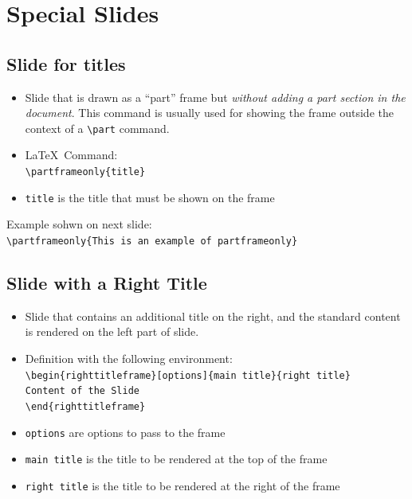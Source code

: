 \documentclass[english,sectioncirclenumberstyle]{ciadbeamer}
\begin{document}
\section{Special Slides}
\sectiontableofcontentslide

\subsection{Slide for titles}

\begin{frame}{\subsecname}
	\begin{itemize}
	\item Slide that is drawn as a ``part'' frame but \emph{without adding a part section in the document}. This command is usually used for showing the frame outside the context of a \texttt{{\textbackslash}part} command.
	\item \LaTeX\ Command:\\
		\texttt{{\textbackslash}partframeonly\{title\}}
	\item \texttt{title} is the title that must be shown on the frame
	\end{itemize}
	\vspace{1cm}
	Example sohwn on next slide: \\
	\texttt{{\textbackslash}partframeonly\{This is an example of partframeonly\}}
\end{frame}


\subsection{Slide with a Right Title}

\begin{frame}{\subsecname}
	\begin{itemize}
	\item Slide that contains an additional title on the right, and the standard content is rendered on the left part of slide.
	\item Definition with the following environment: \\
		\texttt{{\textbackslash}begin\{righttitleframe\}[options]\{main title\}\{right title\}} \\
		\texttt{Content of the Slide} \\
		\texttt{{\textbackslash}end\{righttitleframe\}}
	\item \texttt{options} are options to pass to the frame
	\item \texttt{main title} is the title to be rendered at the top of the frame
	\item \texttt{right title} is the title to be rendered at the right of the frame
	\end{itemize}
\end{frame}
\end{document}
